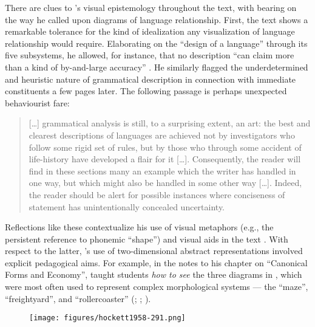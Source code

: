 \documentclass[output=paper]{langscibook}
\begin{document}
There are clues to {\Hockett}'s visual epistemology throughout the text, with bearing on the way he called upon diagrams of language relationship. First, the text shows a remarkable tolerance for the kind of idealization any visualization of language relationship would require. Elaborating on the ``design of a language'' through its five subsystems, he allowed, for instance, that no description ``can claim more than a kind of by-and-large accuracy'' \citep[139]{Hockett19591958}. He similarly flagged the underdetermined and heuristic nature of grammatical description in connection with immediate constituents a few pages later. The following passage is perhaps unexpected behaviourist fare:

\begin{quotation}
[…] grammatical analysis is still, to a surprising extent, an art: the best and clearest descriptions of languages are achieved not by investigators who follow some rigid set of rules, but by those who through some accident of life-history have developed a flair for it […]. Consequently, the reader will find in these sections many an example which the writer has handled in one way, but which might also be handled in some other way […]. Indeed, the reader should be alert for possible instances where conciseness of statement has unintentionally concealed uncertainty.  \citep[147]{Hockett19591958}\label{kaplan:hockettquote}
\end{quotation}

Reflections like these contextualize his use of visual metaphors (e.g., the persistent reference to phonemic ``shape'') and visual aids in the text \citep[130--132]{Hockett19591958}. With respect to the latter, {\Hockett}'s use of two-dimensional abstract representations involved explicit pedagogical aims. For example, in the notes to his chapter on ``Canonical Forms and Economy'', {\Hockett} taught students \emph{how to see} the three diagrams in , which were most often used to represent complex morphological systems — the ``maze'', ``freightyard'', and ``rollercoaster'' (\citealt[290--292]{Hockett19591958}; \citealt{Harris1951}; \citealt{Hoenigswald1950}).

\begin{figure}
    \centering
    \texttt{[image: figures/hockett1958-291.png]}
    \caption{\citet[291]{Hockett19591958}}
    \label{fig:kaplan:hockett1959291}
\end{figure}
\end{document}
